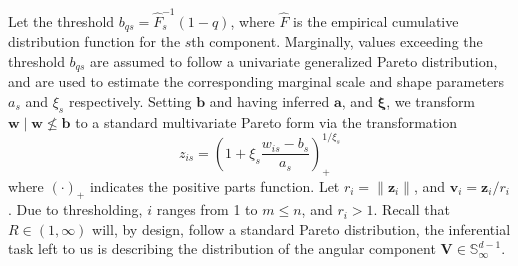 Let the threshold $b_{qs} = \hat{F}_{s}^{-1}(1 - q)$, where $\hat{F}$ is
    the empirical cumulative distribution function for the $s$th component.
    Marginally, values exceeding the threshold $b_{qs}$ are assumed to follow
    a univariate generalized Pareto distribution, and are used to estimate the
    corresponding marginal scale and shape parameters $a_{s}$ and $\xi_{s}$
    respectively.  Setting $\bm{b}$ and having inferred $\bm{a}$, and $\bm{\xi}$, 
    we transform $\bm{w}\mid \bm{w}\not\leq \bm{b}$ to a standard multivariate 
    Pareto form via the transformation
    \begin{equation}
        \label{eqn:standardization}
        z_{is} = \left(1 + \xi_{s}\frac{w_{is} 
            - b_{s}}{a_{s}}\right)_{+}^{1 / \xi_{s}}
    \end{equation}
    where $(\cdot)_+$ indicates the positive parts function.  Let 
    $r_i = \lVert \bm{z}_i\rVert$, and $\bm{v}_i = \bm{z}_i / r_i$.  Due to 
    thresholding, $i$ ranges from 1 to $m\leq n$, and $r_i > 1$.  Recall that
    $R\in (1, \infty)$ will, by design, follow a standard Pareto distribution,
    the inferential task left to us is describing the distribution of the
    angular component $\bm{V}\in\mathbb{S}_{\infty}^{d-1}$.  


